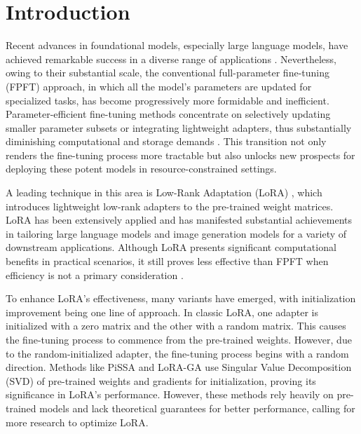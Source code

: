 \section{Introduction}

Recent advances in foundational models, especially large language models, have achieved remarkable success in a diverse range of applications \cite{bommasani2021opportunities,touvron2023llama,achiam2023gpt,fu2024championing,fu2024towards}. Nevertheless, owing to their substantial scale, the conventional full-parameter fine-tuning (FPFT) approach, in which all the model's parameters are updated for specialized tasks, has become progressively more formidable and inefficient. Parameter-efficient fine-tuning methods concentrate on selectively updating smaller parameter subsets or integrating lightweight adapters, thus substantially diminishing computational and storage demands \cite{hu2021lora,liu2022few,kumar2022fine} . This transition not only renders the fine-tuning process more tractable but also unlocks new prospects for deploying these potent models in resource-constrained settings. 

A leading technique in this area is Low-Rank Adaptation (LoRA) \cite{hu2021lora}, which introduces lightweight low-rank adapters to the pre-trained weight matrices. LoRA has been extensively applied and has manifested substantial achievements in tailoring large language models \cite{hu2021lora,mao2025survey} and image generation models \cite{filatov2023low,ji2024advlora} for a variety of downstream applications. Although LoRA presents significant computational benefits in practical scenarios, it still proves less effective than FPFT when efficiency is not a primary consideration \cite{biderman2024lora}. 

To enhance LoRA's effectiveness, many variants have emerged, with initialization improvement being one line of approach. In classic LoRA, one adapter is initialized with a zero matrix and the other with a random matrix. This causes the fine-tuning process to commence from the pre-trained weights. However, due to the random-initialized adapter, the fine-tuning process begins with a random direction. Methods like PiSSA \cite{meng2024pissa} and LoRA-GA \cite{wang2024lora} use Singular Value Decomposition (SVD) of pre-trained weights and gradients for initialization, proving its significance in LoRA's performance. However, these methods rely heavily on pre-trained models and lack theoretical guarantees for better performance, calling for more research to optimize LoRA.

